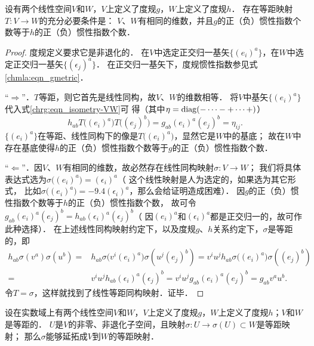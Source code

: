 \begin{proposition}\label{chrg:thm_isometry-VW}
设有两个线性空间$V$和$W$，$V$上定义了度规$g$，$W$上定义了度规$h$．
存在等距映射$T:V\to W$的充分必要条件是：
$V$、$W$有相同的维数，并且$g$的正（负）惯性指数个数等于$h$的正（负）惯性指数个数．    
\end{proposition}
\begin{proof}
        度规定义要求它是非退化的．
    在$V$中选定正交归一基矢$\{(e_i)^a\}$，在$W$中选定正交归一基矢$\{(\epsilon_j)^a\}$．
    在正交归一基矢下，度规惯性指数参见式\eqref{chmla:eqn_gmetric}．
    
    “$\Rightarrow$”．$T$等距，则它首先是线性同构，故$V$、$W$的维数相等．
    将$V$中基矢$\{(e_i)^a\}$代入式\eqref{chrg:eqn_isometry-VW}可
    得（其中$\eta={\rm diag}(-\cdots -+\cdots +)$）
    \begin{equation}
         h_{ab} T\bigl((e_i)^a\bigr) T\bigl((e_j)^b\bigr) = g_{ab} (e_i)^a(e_j)^b = \eta_{ij} .
    \end{equation}
    $\{(e_i)^a\}$在等距、线性同构下的像是$T\bigl((e_i)^a\bigr)$，显然它是$W$中的基底；
    故在$W$中存在基底使得$h$的正（负）惯性指数个数等于$g$的正（负）惯性指数个数．  
    
    “$\Leftarrow$”．因$V$、$W$有相同的维数，故必然存在线性同构映射$\sigma:V\to W$；
    我们将具体表达式选为$\sigma\bigl((e_i)^a\bigr) = (\epsilon_i)^a$（
    这个线性映射是人为选定的，如果选为其它形式，
    比如$\sigma\bigl((e_i)^a\bigr) =-9.4 (\epsilon_i)^a$，那么会给证明造成困难）．
    因$g$的正（负）惯性指数个数等于$h$的正（负）惯性指数个数，
    故可令$g_{ab}(e_i)^a(e_j)^b = h_{ab}(\epsilon_i)^a(\epsilon_j)^b$（
    因$(e_i)^a$和$(\epsilon_i)^a$都是正交归一的，故可作此种选择）．
    在上述线性同构映射约定下，以及度规$g$、$h$关系约定下，$\sigma$是等距的，即
    \begin{align*}
    h_{ab} \sigma(v^a) \sigma(u^b)
    =&h_{ab} \sigma\bigl(v^i(e_i)^a\bigr) \sigma(u^j(e_j)^b)
    =v^i u^j h_{ab} \sigma\bigl((e_i)^a\bigr) \sigma((e_j)^b) \\
    =&v^i u^j h_{ab} (\epsilon_i)^a (\epsilon_j)^b 
    =v^i u^j g_{ab} (e_i)^a (e_j)^b  = g_{ab}v^a u^b .
    \end{align*}
    令$T=\sigma$，这样就找到了线性等距同构映射．证毕．
\end{proof}



\begin{theorem}\label{chmla:thm_Witt-isometry}
    设在实数域上有两个线性空间$V$和$W$，$V$上定义了度规$g$，$W$上定义了度规$h$；$V$和$W$是等距的．
    $U$是$V$的非零、非退化子空间，且映射$\sigma:U\to \sigma(U)\subset W$是等距映射；
    那么$\sigma$能够延拓成$V$到$W$的等距映射．    
\end{theorem}

